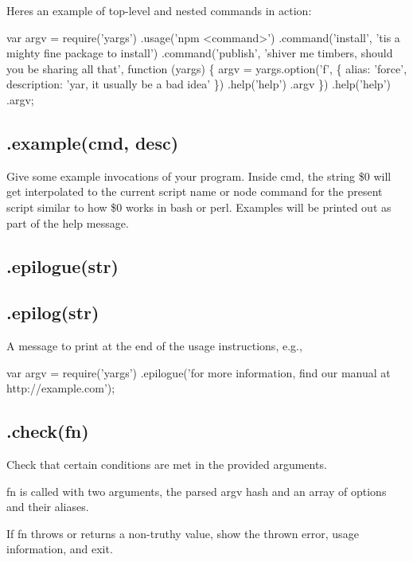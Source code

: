 Here\textquotesingle{}s an example of top-\/level and nested commands in action\+:


\begin{DoxyCode}
var argv = require('yargs')
  .usage('npm <command>')
  .command('install', 'tis a mighty fine package to install')
  .command('publish', 'shiver me timbers, should you be sharing all that', function (yargs) \{
    argv = yargs.option('f', \{
      alias: 'force',
      description: 'yar, it usually be a bad idea'
    \})
    .help('help')
    .argv
  \})
  .help('help')
  .argv;
\end{DoxyCode}


\subsection*{.example(cmd, desc) }

Give some example invocations of your program. Inside {\ttfamily cmd}, the string {\ttfamily \$0} will get interpolated to the current script name or node command for the present script similar to how {\ttfamily \$0} works in bash or perl. Examples will be printed out as part of the help message.

\subsection*{.epilogue(str) }

\subsection*{.epilog(str) }

A message to print at the end of the usage instructions, e.\+g.,


\begin{DoxyCode}
var argv = require('yargs')
  .epilogue('for more information, find our manual at http://example.com');
\end{DoxyCode}


\subsection*{.check(fn) }

Check that certain conditions are met in the provided arguments.

{\ttfamily fn} is called with two arguments, the parsed {\ttfamily argv} hash and an array of options and their aliases.

If {\ttfamily fn} throws or returns a non-\/truthy value, show the thrown error, usage information, and exit.

